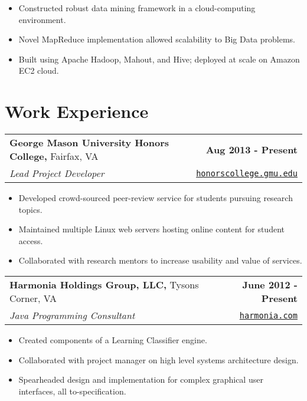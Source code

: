 \documentclass[letterpaper]{article}
\newenvironment{details}
{\begin{itemize}}
{\end{itemize}}
\begin{document}

  \begin{details}
  \item Constructed robust data mining framework in a cloud-computing environment.
  \item Novel MapReduce implementation allowed scalability to Big Data problems.
  \item Built using Apache Hadoop, Mahout, and Hive; deployed at scale on Amazon EC2 cloud.
  \end{details}


  \section{Work Experience}

  \noindent
  \begin{tabularx}{\textwidth}{@{}X r@{}}
    \textbf{George Mason University Honors College,} Fairfax, VA & \textbf{Aug 2013 - Present} \\
    \emph{Lead Project Developer} & \texttt{\href{http://honorscollege.gmu.edu/collegeresearch}{honorscollege.gmu.edu}}
  \end{tabularx}

  \begin{details}
  \item Developed crowd-sourced peer-review service for students pursuing research topics.
  \item Maintained multiple Linux web servers hosting online content for student access.
  \item Collaborated with research mentors to increase usability and value of services.
  \end{details}

  \noindent
  \begin{tabularx}{\textwidth}{@{}X r@{}}
    \textbf{Harmonia Holdings Group, LLC,} Tysons Corner, VA & \textbf{June 2012 - Present} \\
    \emph{Java Programming Consultant} & \texttt{\href{harmonia.com}{harmonia.com}}
  \end{tabularx}

  \begin{details}
  \item Created components of a Learning Classifier engine.
  \item Collaborated with project manager on high level systems architecture design.
  \item Spearheaded design and implementation for complex graphical user interfaces, all to-specification.
  \end{details}
\end{document}
